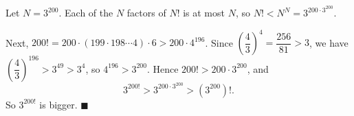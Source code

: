 Let $N=3^{200}$. Each of the $N$ factors of $N!$ is at most $N$, so $N!<N^N=3^{200\cdot3^{200}}$.

Next, $200!=200\cdot(199\cdot198\cdots4)\cdot6>200\cdot4^{196}$. Since $\left(\dfrac43\right)^4=\dfrac{256}{81}>3$, we have $\left(\dfrac43\right)^{196}>3^{49}>3^4$, so $4^{196}>3^{200}$. Hence $200!>200\cdot3^{200}$, and
\[3^{200!}>3^{200\cdot3^{200}}>\left(3^{200}\right)!.\]
So $\boxed{3^{200!}}$ is bigger. $\blacksquare$
